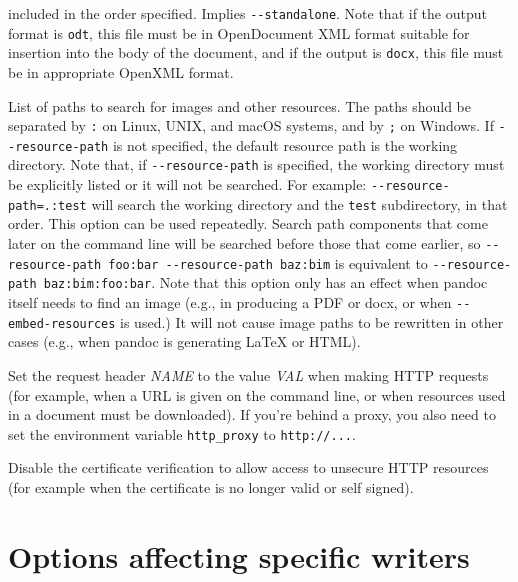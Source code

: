 \documentclass[
  b5paper
]{book}
\begin{document}
\begin{description}
included in the order specified. Implies \texttt{-\/-standalone}. Note
that if the output format is \texttt{odt}, this file must be in
OpenDocument XML format suitable for insertion into the body of the
document, and if the output is \texttt{docx}, this file must be in
appropriate OpenXML format.
\item[\texttt{-\/-resource-path=}\emph{SEARCHPATH}]
List of paths to search for images and other resources. The paths should
be separated by \texttt{:} on Linux, UNIX, and macOS systems, and by
\texttt{;} on Windows. If \texttt{-\/-resource-path} is not specified,
the default resource path is the working directory. Note that, if
\texttt{-\/-resource-path} is specified, the working directory must be
explicitly listed or it will not be searched. For example:
\texttt{-\/-resource-path=.:test} will search the working directory and
the \texttt{test} subdirectory, in that order. This option can be used
repeatedly. Search path components that come later on the command line
will be searched before those that come earlier, so
\texttt{-\/-resource-path\ foo:bar\ -\/-resource-path\ baz:bim} is
equivalent to \texttt{-\/-resource-path\ baz:bim:foo:bar}. Note that
this option only has an effect when pandoc itself needs to find an image
(e.g., in producing a PDF or docx, or when \texttt{-\/-embed-resources}
is used.) It will not cause image paths to be rewritten in other cases
(e.g., when pandoc is generating LaTeX or HTML).
\item[\texttt{-\/-request-header=}\emph{NAME}\texttt{:}\emph{VAL}]
Set the request header \emph{NAME} to the value \emph{VAL} when making
HTTP requests (for example, when a URL is given on the command line, or
when resources used in a document must be downloaded). If you're behind
a proxy, you also need to set the environment variable
\texttt{http\_proxy} to \texttt{http://...}.
\item[\texttt{-\/-no-check-certificate{[}=true\textbar{}false{]}}]
Disable the certificate verification to allow access to unsecure HTTP
resources (for example when the certificate is no longer valid or self
signed).
\end{description}

\section{Options affecting specific
writers}\label{options-affecting-specific-writers}
\end{document}
